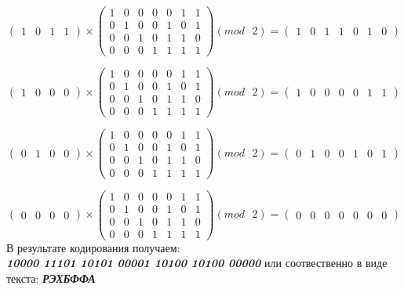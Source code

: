 \documentclass[a5paper, 10pt]{article}
\theoremstyle{definition}
\theoremstyle{plain}
\theoremstyle{remark}
\begin{document}
\begin{equation}
\begin{pmatrix}
1 & 0 & 1 & 1
\end{pmatrix}
 \times
\begin{pmatrix}
1 & 0 & 0 & 0 & 0 & 1 & 1\\
0 & 1 & 0 & 0 & 1 & 0 & 1\\
0 & 0 & 1 & 0 & 1 & 1 & 0\\
0 & 0 & 0 & 1 & 1 & 1 & 1
\end{pmatrix}
(mod \text{ }2)
= \begin{pmatrix}
1 & 0 & 1 & 1 & 0 & 1 & 0
\end{pmatrix}
\end{equation}

\begin{equation}
\begin{pmatrix}
1 & 0 & 0 & 0
\end{pmatrix}
 \times
\begin{pmatrix}
1 & 0 & 0 & 0 & 0 & 1 & 1\\
0 & 1 & 0 & 0 & 1 & 0 & 1\\
0 & 0 & 1 & 0 & 1 & 1 & 0\\
0 & 0 & 0 & 1 & 1 & 1 & 1
\end{pmatrix}
(mod \text{ }2)
= \begin{pmatrix}
1 & 0 & 0 & 0 & 0 & 1 & 1
\end{pmatrix}
\end{equation}

\begin{equation}
\begin{pmatrix}
0 & 1 & 0 & 0
\end{pmatrix}
 \times
\begin{pmatrix}
1 & 0 & 0 & 0 & 0 & 1 & 1\\
0 & 1 & 0 & 0 & 1 & 0 & 1\\
0 & 0 & 1 & 0 & 1 & 1 & 0\\
0 & 0 & 0 & 1 & 1 & 1 & 1
\end{pmatrix}
(mod \text{ }2)
= \begin{pmatrix}
0 & 1 & 0 & 0 & 1 & 0 & 1
\end{pmatrix}
\end{equation}

\begin{equation}
\begin{pmatrix}
0 & 0 & 0 & 0
\end{pmatrix}
 \times
\begin{pmatrix}
1 & 0 & 0 & 0 & 0 & 1 & 1\\
0 & 1 & 0 & 0 & 1 & 0 & 1\\
0 & 0 & 1 & 0 & 1 & 1 & 0\\
0 & 0 & 0 & 1 & 1 & 1 & 1
\end{pmatrix}
(mod \text{ }2)
= \begin{pmatrix}
0 & 0 & 0 & 0 & 0 & 0 & 0
\end{pmatrix}
\end{equation}
В результате кодирования получаем:\\
 \textbf{\textit{10000 11101 10101 00001 10100 10100 00000}} или соотвественно в виде текста:  \textbf{\textit{РЭХБФФА}}
\end{document}
